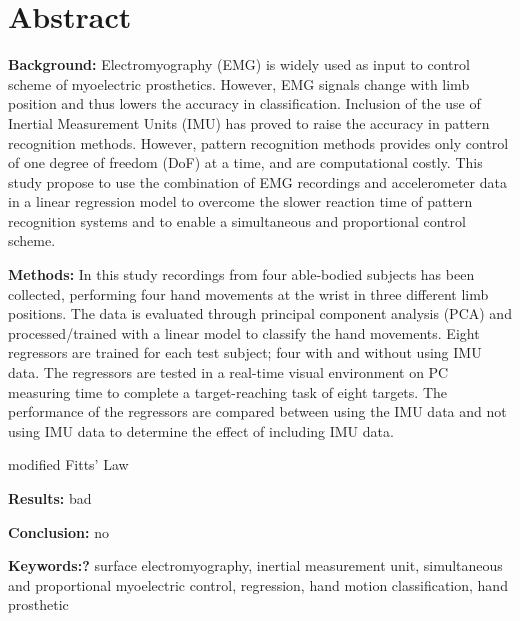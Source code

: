 \section{Abstract}

\textbf{Background:} Electromyography (EMG) is widely used as input to control scheme of myoelectric prosthetics. However, EMG signals change with limb position and thus lowers the accuracy in classification.%
Inclusion of the use of Inertial Measurement Units (IMU) has proved to raise the accuracy in pattern recognition methods. However, pattern recognition methods provides only control of one degree of freedom (DoF) at a time, and are computational costly. This study propose to use the combination of EMG recordings and accelerometer data in a linear regression model to overcome the slower reaction time of pattern recognition systems and to enable a simultaneous and proportional control scheme. 


\textbf{Methods:} In this study recordings from four able-bodied subjects has been collected, performing four hand movements at the wrist in three different limb positions. The data is evaluated through principal component analysis (PCA) and processed/trained with a linear model to classify the hand movements. Eight regressors are trained for each test subject; four with and without using IMU data. The regressors are tested in a real-time visual environment on PC measuring time to complete a target-reaching task of eight targets. The performance of the regressors are compared between using the IMU data and not using IMU data to determine the effect of including IMU data. 


modified Fitts' Law 


\textbf{Results:} bad


\textbf{Conclusion:} no


\textbf{Keywords:?} surface electromyography, inertial measurement unit, simultaneous and proportional myoelectric control, regression, hand motion classification, hand prosthetic
